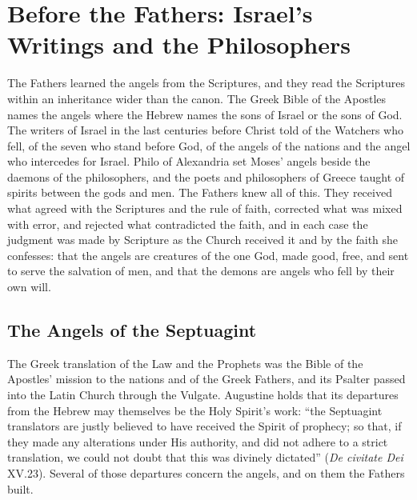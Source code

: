 \section{Before the Fathers: Israel's Writings and the Philosophers}\label{sec:before-christ}

The Fathers learned the angels from the Scriptures, and they read the
Scriptures within an inheritance wider than the canon. The Greek Bible of
the Apostles names the angels where the Hebrew names the sons of Israel or
the sons of God. The writers of Israel in the last centuries before Christ
told of the Watchers who fell, of the seven who stand before God, of the
angels of the nations and the angel who intercedes for Israel. Philo of
Alexandria set Moses' angels beside the daemons of the philosophers, and
the poets and philosophers of Greece taught of spirits between the gods
and men. The Fathers knew all of this. They received what agreed with the
Scriptures and the rule of faith, corrected what was mixed with error, and
rejected what contradicted the faith, and in each case the judgment was
made by Scripture as the Church received it and by the faith she confesses:
that the angels are creatures of the one God, made good, free, and sent to
serve the salvation of men, and that the demons are angels who fell by
their own will.

\sectionguard
\subsection{The Angels of the Septuagint}\label{sec:bc-lxx}

The Greek translation of the Law and the Prophets was the Bible of the
Apostles' mission to the nations and of the Greek Fathers, and its Psalter
passed into the Latin Church through the Vulgate. Augustine holds that its
departures from the Hebrew may themselves be the Holy Spirit's work: ``the
Septuagint translators are justly believed to have received the Spirit of
prophecy; so that, if they made any alterations under His authority, and
did not adhere to a strict translation, we could not doubt that this was
divinely dictated'' (\emph{De civitate Dei} XV.23). Several of those
departures concern the angels, and on them the Fathers built.

